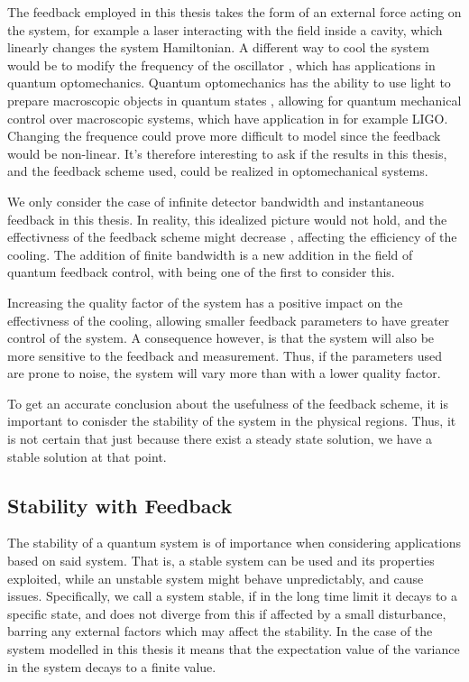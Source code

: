 The feedback employed in this thesis takes the form of an external force acting on the system, for example a laser interacting with the field inside a cavity, which linearly changes the system Hamiltonian. A different way to cool the system would be to modify the frequency of the oscillator \cite{Habibi:2016}, which has applications in quantum optomechanics. Quantum optomechanics has the ability to use light to prepare macroscopic objects in quantum states \cite{Chen:2013}, allowing for quantum mechanical control over macroscopic systems, which have application in for example LIGO. Changing the frequence could prove more difficult to model since the feedback would be non-linear. It's therefore interesting to ask if the results in this thesis, and the feedback scheme used, could be realized in optomechanical systems. 

We only consider the case of infinite detector bandwidth and instantaneous feedback in this thesis. In reality, this idealized picture would not hold, and the effectivness of the feedback scheme might decrease \cite{Annby-Andersson:2024}, affecting the efficiency of the cooling. The addition of finite bandwidth is a new addition in the field of quantum feedback control, with \cite{De-Sousa:2025} being one of the first to consider this. 

Increasing the quality factor of the system has a positive impact on the effectivness of the cooling, allowing smaller feedback parameters to have greater control of the system. A consequence however, is that the system will also be more sensitive to the feedback and measurement. Thus, if the parameters used are prone to noise, the system will vary more than with a lower quality factor.

To get an accurate conclusion about the usefulness of the feedback scheme, it is important to conisder the stability of the system in the physical regions. Thus, it is not certain that just because there exist a steady state solution, we have a stable solution at that point.



\subsection{Stability with Feedback}
The stability of a quantum system is of importance when considering applications based on said system. That is, a stable system can be used and its properties exploited, while an unstable system might behave unpredictably, and cause issues. Specifically, we call a system stable, if in the long time limit it decays to a specific state, and does not diverge from this if affected by a small disturbance, barring any external factors which may affect the stability. In the case of the system modelled in this thesis it means that the expectation value of the variance in the system decays to a finite value.

